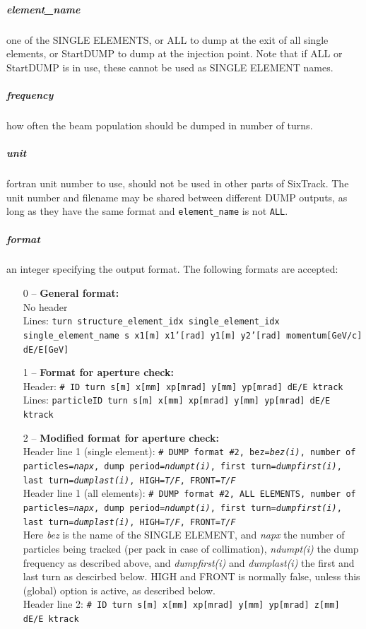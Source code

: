 \subparagraph{element\_name}
one of the SINGLE ELEMENTS, or ALL to dump at the exit of all single elements, or StartDUMP to dump at the injection point.
Note that if ALL or StartDUMP is in use, these cannot be used as SINGLE ELEMENT names.
\subparagraph{frequency}
how often the beam population should be dumped in number of turns.
\subparagraph{unit}
fortran unit number to use, should not be used in other parts of SixTrack.
The unit number and filename may be shared between different DUMP outputs, as long as they have the same format and \texttt{element\_name} is not \texttt{ALL}.
\subparagraph{format}
an integer specifying the output format.
The following formats are accepted:
\begin{enumerate}
	\item[0] -- \textbf{General format:}\\
	No header\\
	Lines: \texttt{turn structure\_element\_idx single\_element\_idx single\_element\_name s x1[m] x1'[rad] y1[m] y2'[rad] momentum[GeV/c] dE/E[GeV]}
	\item[1] -- \textbf{Format for aperture check:}\\
	Header: \texttt{\# ID turn s[m] x[mm] xp[mrad] y[mm] yp[mrad] dE/E ktrack}\\
	Lines: \texttt{particleID turn s[m] x[mm] xp[mrad] y[mm] yp[mrad] dE/E ktrack}
	\item[2] -- \textbf{Modified format for aperture check:}\\
	Header line 1 (single element): \texttt{\# DUMP format \#2, bez=\textit{bez(i)}, number of particles=\textit{napx}, dump period=\textit{ndumpt(i)}, first turn=\textit{dumpfirst(i)}, last turn=\textit{dumplast(i)}, HIGH=\textit{T/F}, FRONT=\textit{T/F}}\\
	Header line 1 (all elements): \texttt{\# DUMP format \#2, ALL ELEMENTS, number of particles=\textit{napx}, dump period=\textit{ndumpt(i)}, first turn=\textit{dumpfirst(i)}, last turn=\textit{dumplast(i)}, HIGH=\textit{T/F}, FRONT=\textit{T/F}}\\
        Here \textit{bez} is the name of the SINGLE ELEMENT, and \textit{napx} the number of particles being tracked (per pack in case of collimation), \textit{ndumpt(i)} the dump frequency as described above, and \textit{dumpfirst(i)} and \textit{dumplast(i)} the first and last turn as descirbed below.
        HIGH and FRONT is normally false, unless this (global) option is active, as described below.\\
	Header line 2: \texttt{\# ID turn s[m] x[mm] xp[mrad] y[mm] yp[mrad] z[mm] dE/E ktrack}\\

\end{enumerate}
